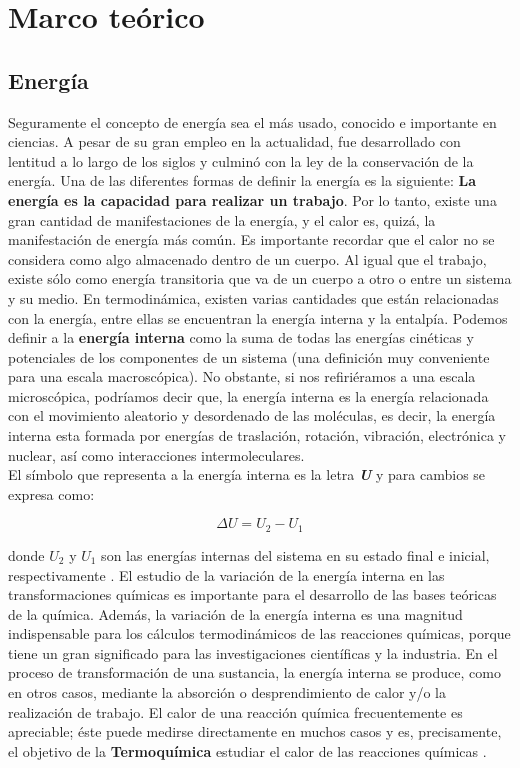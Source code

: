 \chapter{Marco teórico}

\section{Energía}
Seguramente el concepto de energía sea el más usado, conocido e importante en ciencias. A pesar de su gran empleo en la actualidad, fue desarrollado con lentitud a lo largo de los siglos y culminó con la ley de la conservación de la energía. Una de las diferentes formas de definir la energía es la siguiente: \textbf{La energía es la capacidad para realizar un trabajo}\cite{Atkins2014}. Por lo tanto, existe una gran cantidad de manifestaciones de la energía, y el calor es, quizá, la manifestación de energía más común. Es importante recordar que el calor no se considera como algo almacenado dentro de un cuerpo. Al igual que el trabajo, existe sólo como energía transitoria que va de un cuerpo a otro o entre un sistema y su medio. En termodinámica, existen varias cantidades que están relacionadas con la energía, entre ellas se encuentran la energía interna y la entalpía. Podemos definir a la \textbf{energía interna} como la suma de todas las energías cinéticas y potenciales de los componentes de un sistema (una definición muy conveniente para una escala macroscópica). No obstante, si nos refiriéramos a una escala microscópica, podríamos decir que, la energía interna es la energía relacionada con el movimiento aleatorio y desordenado de las moléculas, es decir, la energía interna esta formada por energías de traslación, rotación, vibración, electrónica y nuclear, así como interacciones intermoleculares. \\
\newpage
El símbolo que representa a la energía interna  es la letra \textit{\textbf{U}} y para cambios se expresa como: 

\begin{equation}
\Delta U = U_{2} - U_{1}
\label{eq:3.1}
\end{equation}

donde $U_{2}$ y $U_{1}$ son las energías internas del sistema en su estado final e inicial, respectivamente \cite{Chang2008}. El estudio de la variación de la energía interna en las transformaciones químicas es importante para el desarrollo de las bases teóricas de la química. Además, la variación de la energía interna es una magnitud indispensable para los cálculos termodinámicos de las reacciones químicas, porque tiene un gran significado para las investigaciones científicas y la industria. En el proceso de transformación de una sustancia, la energía interna se produce, como en otros casos, mediante la absorción o desprendimiento de calor y/o la realización de trabajo. El calor de una reacción química frecuentemente es apreciable; éste puede medirse directamente en muchos casos y es, precisamente, el objetivo de la \textbf{Termoquímica} estudiar el calor de las reacciones químicas \cite{Guerasimov1971}.\\


